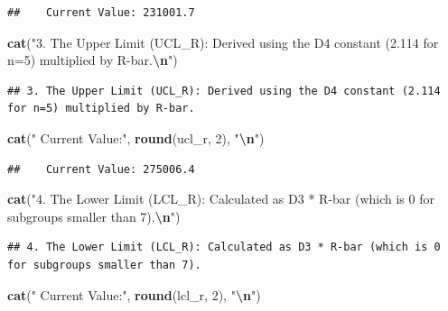 \documentclass[
]{article}
\newenvironment{Shaded}{\begin{snugshade}}{\end{snugshade}}
\newcommand{\DecValTok}[1]{\textcolor[rgb]{0.00,0.00,0.81}{#1}}
\newcommand{\FunctionTok}[1]{\textcolor[rgb]{0.13,0.29,0.53}{\textbf{#1}}}
\newcommand{\NormalTok}[1]{#1}
\newcommand{\SpecialCharTok}[1]{\textcolor[rgb]{0.81,0.36,0.00}{\textbf{#1}}}
\newcommand{\StringTok}[1]{\textcolor[rgb]{0.31,0.60,0.02}{#1}}
\begin{document}
\begin{verbatim}
##    Current Value: 231001.7
\end{verbatim}

\begin{Shaded}
\begin{Highlighting}[]
\FunctionTok{cat}\NormalTok{(}\StringTok{"3. The Upper Limit (UCL\_R): Derived using the D4 constant (2.114 for n=5) multiplied by R{-}bar.}\SpecialCharTok{\textbackslash{}n}\StringTok{"}\NormalTok{)}
\end{Highlighting}
\end{Shaded}

\begin{verbatim}
## 3. The Upper Limit (UCL_R): Derived using the D4 constant (2.114 for n=5) multiplied by R-bar.
\end{verbatim}

\begin{Shaded}
\begin{Highlighting}[]
\FunctionTok{cat}\NormalTok{(}\StringTok{"   Current Value:"}\NormalTok{, }\FunctionTok{round}\NormalTok{(ucl\_r, }\DecValTok{2}\NormalTok{), }\StringTok{"}\SpecialCharTok{\textbackslash{}n}\StringTok{"}\NormalTok{)}
\end{Highlighting}
\end{Shaded}

\begin{verbatim}
##    Current Value: 275006.4
\end{verbatim}

\begin{Shaded}
\begin{Highlighting}[]
\FunctionTok{cat}\NormalTok{(}\StringTok{"4. The Lower Limit (LCL\_R): Calculated as D3 * R{-}bar (which is 0 for subgroups smaller than 7).}\SpecialCharTok{\textbackslash{}n}\StringTok{"}\NormalTok{)}
\end{Highlighting}
\end{Shaded}

\begin{verbatim}
## 4. The Lower Limit (LCL_R): Calculated as D3 * R-bar (which is 0 for subgroups smaller than 7).
\end{verbatim}

\begin{Shaded}
\begin{Highlighting}[]
\FunctionTok{cat}\NormalTok{(}\StringTok{"   Current Value:"}\NormalTok{, }\FunctionTok{round}\NormalTok{(lcl\_r, }\DecValTok{2}\NormalTok{), }\StringTok{"}\SpecialCharTok{\textbackslash{}n}\StringTok{"}\NormalTok{)}
\end{Highlighting}
\end{Shaded}
\end{document}
